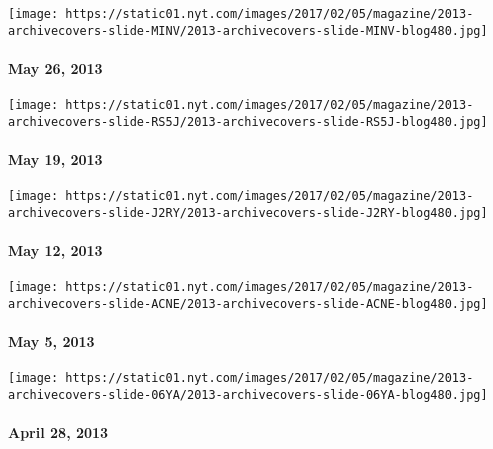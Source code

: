 \href{http://www.nytimes.com/indexes/2013/05/26/magazine/index.html}{}

\texttt{[image: https://static01.nyt.com/images/2017/02/05/magazine/2013-archivecovers-slide-MINV/2013-archivecovers-slide-MINV-blog480.jpg]}

\hypertarget{may-26-2013}{%
\paragraph{May 26, 2013}\label{may-26-2013}}

\href{http://www.nytimes.com/indexes/2013/05/20/magazine/index.html}{}

\texttt{[image: https://static01.nyt.com/images/2017/02/05/magazine/2013-archivecovers-slide-RS5J/2013-archivecovers-slide-RS5J-blog480.jpg]}

\hypertarget{may-19-2013}{%
\paragraph{May 19, 2013}\label{may-19-2013}}

\href{http://www.nytimes.com/indexes/2013/05/12/magazine/index.html}{}

\texttt{[image: https://static01.nyt.com/images/2017/02/05/magazine/2013-archivecovers-slide-J2RY/2013-archivecovers-slide-J2RY-blog480.jpg]}

\hypertarget{may-12-2013}{%
\paragraph{May 12, 2013}\label{may-12-2013}}

\href{http://www.nytimes.com/indexes/2013/05/05/magazine/index.html}{}

\texttt{[image: https://static01.nyt.com/images/2017/02/05/magazine/2013-archivecovers-slide-ACNE/2013-archivecovers-slide-ACNE-blog480.jpg]}

\hypertarget{may-5-2013}{%
\paragraph{May 5, 2013}\label{may-5-2013}}

\href{http://www.nytimes.com/indexes/2013/04/28/magazine/index.html}{}

\texttt{[image: https://static01.nyt.com/images/2017/02/05/magazine/2013-archivecovers-slide-06YA/2013-archivecovers-slide-06YA-blog480.jpg]}

\hypertarget{april-28-2013}{%
\paragraph{April 28, 2013}\label{april-28-2013}}

